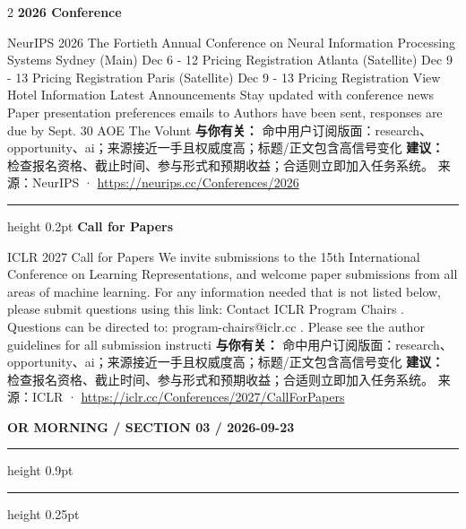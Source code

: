 \documentclass[10.5pt]{ctexart}
\begin{document}
\begin{multicols}{2}
{\large\bfseries 2026 Conference}\par
NeurIPS 2026 The Fortieth Annual Conference on Neural Information Processing Systems Sydney (Main) Dec 6 - 12 Pricing Registration Atlanta (Satellite) Dec 9 - 13 Pricing Registration Paris (Satellite) Dec 9 - 13 Pricing Registration View Hotel Information Latest Announcements Stay updated with conference news Paper presentation preferences emails to Authors have been sent, responses are due by Sept. 30 AOE The Volunt
\textbf{与你有关：} 命中用户订阅版面：research、opportunity、ai；来源接近一手且权威度高；标题/正文包含高信号变化
\textbf{建议：} 检查报名资格、截止时间、参与形式和预期收益；合适则立即加入任务系统。
{\footnotesize\color{ormuted} 来源：NeurIPS · \url{https://neurips.cc/Conferences/2026}}
\vspace{2mm}
\hrule height 0.2pt
\vspace{2mm}
{\large\bfseries Call for Papers}\par
ICLR 2027 Call for Papers We invite submissions to the 15th International Conference on Learning Representations, and welcome paper submissions from all areas of machine learning. For any information needed that is not listed below, please submit questions using this link: Contact ICLR Program Chairs . Questions can be directed to: program-chairs@iclr.cc . Please see the author guidelines for all submission instructi
\textbf{与你有关：} 命中用户订阅版面：research、opportunity、ai；来源接近一手且权威度高；标题/正文包含高信号变化
\textbf{建议：} 检查报名资格、截止时间、参与形式和预期收益；合适则立即加入任务系统。
{\footnotesize\color{ormuted} 来源：ICLR · \url{https://iclr.cc/Conferences/2027/CallForPapers}}
\end{multicols}
\newpage
{\small\bfseries OR MORNING / SECTION 03 / 2026-09-23}
\vspace{2mm}
\hrule height 0.9pt
\vspace{1.5mm}
\hrule height 0.25pt
\vspace{4mm}
\end{document}
